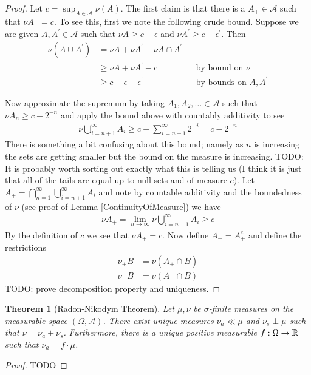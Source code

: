 \documentclass{amsart}
\newtheorem{thm}{Theorem}[section]
\theoremstyle{remark}
\theoremstyle{definition}
\begin{document}
\begin{proof}Let $c=\sup_{A \in \mathcal{A}} \nu(A)$.  The first claim
  is that there is a $A_+ \in \mathcal{A}$ such that $\nu A_+ = c$.
  To see this, first we note the following crude bound.  Suppose we
  are given $A,A^\prime \in \mathcal{A}$ such that $\nu A \geq c -
  \epsilon$ and $\nu A^\prime \geq c - \epsilon^\prime$.  Then 
\begin{align*}
\nu (A \cup A^\prime) &= \nu A + \nu A^\prime - \nu A \cap A^\prime \\
&\geq \nu A + \nu A^\prime - c & &\text{by bound on $\nu$} \\
&\geq c - \epsilon - \epsilon^\prime & &\text{by bounds on $A,A^\prime$}
\end{align*}

Now approximate the supremum by taking $A_1, A_2, \dots \in \mathcal{A}$ such that $\nu
  A_n \geq c - 2^{-n}$ and apply the bound above with countably
  additivity to see 
\begin{align*}
\nu \bigcup_{i=n+1}^\infty A_i \geq c - \sum_{i=n+1}^\infty 2^{-i} = c - 2^{-n}
\end{align*}
There is something a bit confusing about this bound; namely as $n$
is increasing the sets are getting smaller but the bound on the
measure is increasing.  TODO: It is probably worth sorting out exactly
what this is telling us (I think it is just that all of the tails are
equal up to null sets and of measure $c$).
Let $A_+ = \bigcap_{n=1}^\infty \bigcup_{i=n+1}^\infty A_i$ and note by
countable additivity and the boundedness of $\nu$ (see proof of Lemma
\ref{ContinuityOfMeasure}) we have 
\begin{align*} \nu A_+ = \lim_{n \to \infty} \nu
  \bigcup_{i=n+1}^\infty A_i \geq c
\end{align*}
By the definition of $c$ we see that $\nu A_+ = c$.  Now define $A_- =
A_+^c$ and define the restrictions 
\begin{align*}
\nu_+ B &= \nu (A_+ \cap B ) \\
\nu_- B &= \nu ( A_- \cap B )
\end{align*}
TODO: prove decomposition property and uniqueness.
\end{proof}

\begin{thm}[Radon-Nikodym Theorem]\label{RadonNikodym}Let $\mu, \nu$
  be $\sigma$-finite measures on the measurable space $(\Omega,
  \mathcal{A})$.  There exist unique measures $\nu_a \ll \mu$ and
  $\nu_s \perp \mu$ such that $\nu = \nu_a + \nu_s$.  Furthermore,
  there is a unique positive measurable $f : \Omega \to \mathbb{R}$ such
  that $\nu_a = f \cdot \mu$.
\end{thm}
\begin{proof}TODO
\end{proof}
\end{document}
